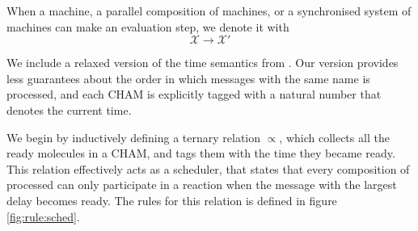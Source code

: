 When a machine, a parallel composition of machines, or a synchronised system of
machines can make an evaluation step, we denote it with
\begin{equation*}
 \boxed{\mathcal{X} \longrightarrow \mathcal{X}'}
\end{equation*}

%
We include a relaxed version of the time semantics from \cite{timed-join}. Our
version provides less guarantees about the order in which messages with the
same name is processed, and each CHAM is explicitly tagged with a natural
number that denotes the current time.

We begin by inductively defining a ternary relation $\propto$, which collects
all the ready molecules in a CHAM, and tags them with the time they became
ready. This relation effectively acts as a scheduler, that states that every
composition of processed can only participate in a reaction when the message
with the largest delay becomes ready. The rules for this relation is defined in
figure \ref{fig:rule:sched}.

